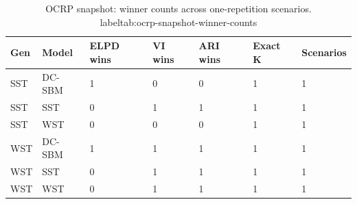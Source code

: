 \begin{table}[!h]
\centering
\caption{OCRP snapshot: winner counts across one-repetition scenarios.\\label{tab:ocrp-snapshot-winner-counts}}
\centering
\begin{tabular}[t]{lllllll}
\toprule
Gen & Model & ELPD wins & VI wins & ARI wins & Exact K & Scenarios\\
\midrule
SST & DC-SBM & 1 & 0 & 0 & 1 & 1\\
SST & SST & 0 & 1 & 1 & 1 & 1\\
SST & WST & 0 & 0 & 0 & 1 & 1\\
WST & DC-SBM & 1 & 1 & 1 & 1 & 1\\
WST & SST & 0 & 1 & 1 & 1 & 1\\
WST & WST & 0 & 1 & 1 & 1 & 1\\
\bottomrule
\end{tabular}
\end{table}
